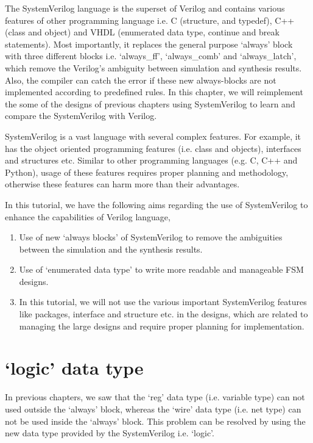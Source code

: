 The SystemVerilog language is the superset of Verilog and contains various features of other programming language i.e. C (structure, and typedef), C++ (class and object) and VHDL (enumerated data type, continue and break statements). Most importantly, it replaces the general purpose `always' block with three different blocks i.e. `always\_ff', `always\_comb' and `always\_latch', which remove the Verilog's ambiguity between simulation and synthesis results. Also, the compiler can catch the error if these new always-blocks are not implemented according to predefined rules. In this chapter, we will reimplement the some of the designs of previous chapters using SystemVerilog to learn and compare the SystemVerilog with Verilog. 

\begin{noNumBox}
	SystemVerilog is a vast language with several complex features. For example, it has the object oriented programming features (i.e. class and objects), interfaces and structures etc. Similar to other programming languages (e.g. C, C++ and Python), usage of these features requires proper planning and methodology, otherwise these features can harm more than their advantages. 
	
	In this tutorial, we have the following aims regarding the use of SystemVerilog to enhance the capabilities of Verilog language, 
	\begin{enumerate}
		\item Use of new `always blocks' of SystemVerilog to remove the ambiguities between the simulation and the synthesis results. 
		\item Use of `enumerated data type' to write more readable and manageable FSM designs. 
		\item In this tutorial, we will not use the various important SystemVerilog features like packages, interface and structure etc. in the designs, which are related to managing the large designs and require proper planning for implementation. 
	\end{enumerate} 
\end{noNumBox}

\section{`logic' data type}
In previous chapters, we saw that the `reg' data type (i.e. variable type) can not used outside the `always' block, whereas the `wire' data type (i.e. net type) can not be used inside the `always' block. This problem can be resolved by using the new data type provided by the SystemVerilog i.e. `logic'. 

